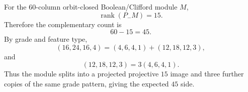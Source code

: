 \makeatletter
{}
\makeatother

\begin{theorem}
\label{thm:boolean-fortyfive-split}
For the $60$-column orbit-closed Boolean/Clifford module $M$,
\[
  \operatorname{rank}(P_-M)=15.
\]
Therefore the complementary count is
\[
  60-15=45.
\]
By grade and feature type,
\[
  (16,24,16,4)=(4,6,4,1)+(12,18,12,3),
\]
and
\[
  (12,18,12,3)=3(4,6,4,1).
\]
Thus the module splits into a projected projective $15$ image and three further
copies of the same grade pattern, giving the expected $45$ side.
\end{theorem}
